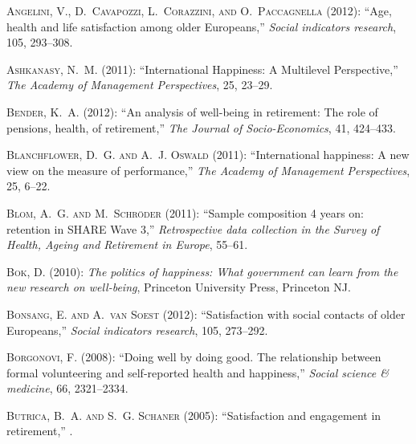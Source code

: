 \documentclass[10pt, letterpaper]{article}
\begin{document}
\begin{spacing}{1.4}
\begin{thebibliography}{87}
\textsc{Angelini, V., D.~Cavapozzi, L.~Corazzini, and O.~Paccagnella} (2012):
  \enquote{Age, health and life satisfaction among older Europeans,}
  \emph{Social indicators research}, 105, 293--308.

\textsc{Ashkanasy, N.~M.} (2011): \enquote{International Happiness: A
  Multilevel Perspective,} \emph{The Academy of Management Perspectives}, 25,
  23--29.

\textsc{Bender, K.~A.} (2012): \enquote{An analysis of well-being in
  retirement: The role of pensions, health, of retirement,} \emph{The Journal
  of Socio-Economics}, 41, 424--433.

\textsc{Blanchflower, D.~G. and A.~J. Oswald} (2011): \enquote{International
  happiness: A new view on the measure of performance,} \emph{The Academy of
  Management Perspectives}, 25, 6--22.

\textsc{Blom, A.~G. and M.~Schr{\"o}der} (2011): \enquote{Sample composition 4
  years on: retention in SHARE Wave 3,} \emph{Retrospective data collection in
  the Survey of Health, Ageing and Retirement in Europe}, 55--61.

\textsc{Bok, D.} (2010): \emph{The politics of happiness: What government can
  learn from the new research on well-being}, Princeton University Press,
  Princeton NJ.

\textsc{Bonsang, E. and A.~van Soest} (2012): \enquote{Satisfaction with social
  contacts of older Europeans,} \emph{Social indicators research}, 105,
  273--292.

\textsc{Borgonovi, F.} (2008): \enquote{Doing well by doing good. The
  relationship between formal volunteering and self-reported health and
  happiness,} \emph{Social science \& medicine}, 66, 2321--2334.

\textsc{Butrica, B.~A. and S.~G. Schaner} (2005): \enquote{Satisfaction and
  engagement in retirement,} .


\end{thebibliography}
\end{spacing}
\end{document}
